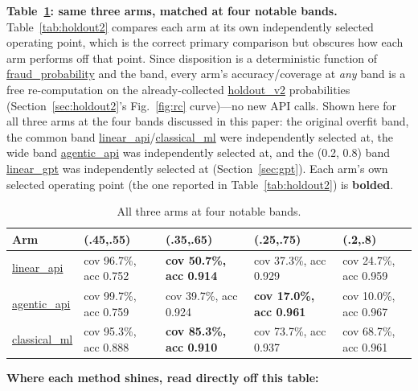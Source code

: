 \documentclass[]{ieeeaccess}
\newcommand{\code}[1]{\url{#1}}
\begin{document}
\textbf{Table~\ref{tab:bands}: same three arms, matched at four notable bands.}
Table~\ref{tab:holdout2} compares each arm at its own independently selected operating
point, which is the correct primary comparison but obscures how each arm
performs off that point. Since disposition is a deterministic function of
\code{fraud_probability} and the band, every arm's accuracy/coverage at
\textit{any} band is a free re-computation on the already-collected
\code{holdout_v2} probabilities (Section~\ref{sec:holdout2}'s Fig.~\ref{fig:rc} curve)---no new
API calls. Shown here for all three arms at the four bands discussed in
this paper: the original overfit band, the common band
\code{linear_api}/\code{classical_ml} were independently selected at,
the wide band \code{agentic_api} was independently selected at, and the
(0.2, 0.8) band \code{linear_gpt} was independently selected at
(Section~\ref{sec:gpt}). Each
arm's own selected operating point (the one reported in Table~\ref{tab:holdout2}) is
\textbf{bolded}.

\begin{table}[H]
\centering
\caption{All three arms at four notable bands.}\label{tab:bands}
\scriptsize
\begin{tabularx}{\columnwidth}{@{}lXXXX@{}}
\toprule
\textbf{Arm} & \textbf{(.45,.55)} & \textbf{(.35,.65)} & \textbf{(.25,.75)} & \textbf{(.2,.8)} \\
\midrule
\code{linear_api} & cov 96.7\%, acc 0.752 & \textbf{cov 50.7\%, acc 0.914} & cov 37.3\%, acc 0.929 & cov 24.7\%, acc 0.959 \\
\code{agentic_api} & cov 99.7\%, acc 0.759 & cov 39.7\%, acc 0.924 & \textbf{cov 17.0\%, acc 0.961} & cov 10.0\%, acc 0.967 \\
\code{classical_ml} & cov 95.3\%, acc 0.888 & \textbf{cov 85.3\%, acc 0.910} & cov 73.7\%, acc 0.937 & cov 68.7\%, acc 0.961 \\
\bottomrule
\end{tabularx}
\end{table}

\textbf{Where each method shines, read directly off this table:}
\end{document}
